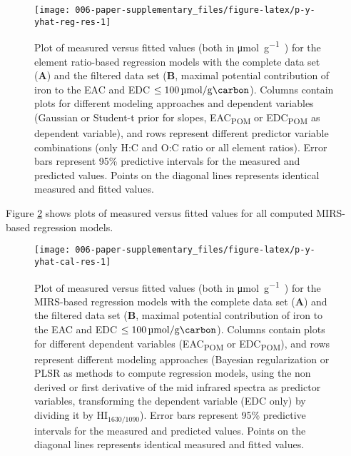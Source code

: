 \documentclass[draft,linenumbers]{agujournal2018}
\begin{document}
\begin{figure}[H]

{\centering \texttt{[image: 006-paper-supplementary\_files/figure-latex/p-y-yhat-reg-res-1]} 

}

\caption{Plot of measured versus fitted values (both in \si{\micro\mol\per\gram\carbon}) for the element ratio-based regression models with the complete data set (\textbf{A}) and the filtered data set (\textbf{B}, maximal potential contribution of iron to the EAC and EDC $\le\SI{100}{\micro\mol\per\gram\carbon}$). Columns contain plots for different modeling approaches and dependent variables (Gaussian or Student-t prior for slopes, EAC\textsubscript{POM} or EDC\textsubscript{POM} as dependent variable), and rows represent different predictor variable combinations (only H:C and O:C ratio or all element ratios). Error bars represent 95\% predictive intervals for the measured and predicted values. Points on the diagonal lines represents identical measured and fitted values.}\label{fig:p-y-yhat-reg-res}
\end{figure}

\clearpage

Figure \ref{fig:p-y-yhat-cal-res} shows plots of measured versus fitted
values for all computed MIRS-based regression models.

\begin{figure}[H]

{\centering \texttt{[image: 006-paper-supplementary\_files/figure-latex/p-y-yhat-cal-res-1]} 

}

\caption{Plot of measured versus fitted values (both in \si{\micro\mol\per\gram\carbon}) for the MIRS-based regression models with the complete data set (\textbf{A}) and the filtered data set (\textbf{B}, maximal potential contribution of iron to the EAC and EDC $\le\SI{100}{\micro\mol\per\gram\carbon}$). Columns contain plots for different dependent variables (EAC\textsubscript{POM} or EDC\textsubscript{POM}), and rows represent different modeling approaches (Bayesian regularization or PLSR as methods to compute regression models, using the non derived or first derivative of the mid infrared spectra as predictor variables, transforming the dependent variable (EDC only) by dividing it by HI$_\text{1630/1090}$). Error bars represent 95\% predictive intervals for the measured and predicted values. Points on the diagonal lines represents identical measured and fitted values.}\label{fig:p-y-yhat-cal-res}
\end{figure}
\end{document}
